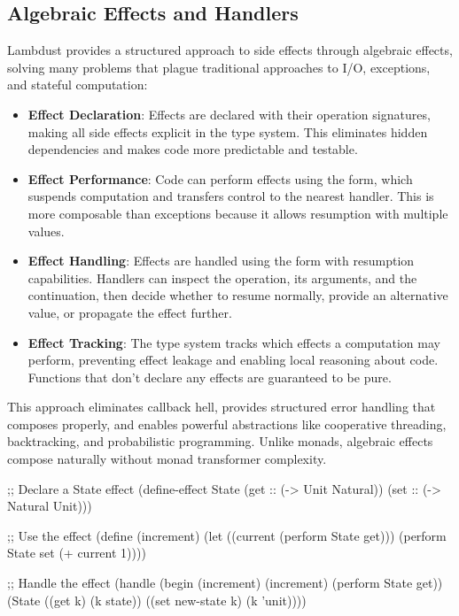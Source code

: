 \subsection{Algebraic Effects and Handlers}
\label{subsec:effects}

Lambdust provides a structured approach to side effects through algebraic effects, solving many problems that plague traditional approaches to I/O, exceptions, and stateful computation:

\begin{itemize}
\item \textbf{Effect Declaration}: Effects are declared with their operation signatures, making all side effects explicit in the type system. This eliminates hidden dependencies and makes code more predictable and testable.

\item \textbf{Effect Performance}: Code can perform effects using the  form, which suspends computation and transfers control to the nearest handler. This is more composable than exceptions because it allows resumption with multiple values.

\item \textbf{Effect Handling}: Effects are handled using the  form with resumption capabilities. Handlers can inspect the operation, its arguments, and the continuation, then decide whether to resume normally, provide an alternative value, or propagate the effect further.

\item \textbf{Effect Tracking}: The type system tracks which effects a computation may perform, preventing effect leakage and enabling local reasoning about code. Functions that don't declare any effects are guaranteed to be pure.
\end{itemize}

This approach eliminates callback hell, provides structured error handling that composes properly, and enables powerful abstractions like cooperative threading, backtracking, and probabilistic programming. Unlike monads, algebraic effects compose naturally without monad transformer complexity.

\begin{example}
\begin{lambdustcode}
;; Declare a State effect
(define-effect State
  (get :: (-> Unit Natural))
  (set :: (-> Natural Unit)))

;; Use the effect
(define (increment)
  (let ((current (perform State get)))
    (perform State set (+ current 1))))

;; Handle the effect
(handle
  (begin (increment) (increment) (perform State get))
  (State
    ((get k) (k state))
    ((set new-state k) (k 'unit))))
\end{lambdustcode}
\end{example}

